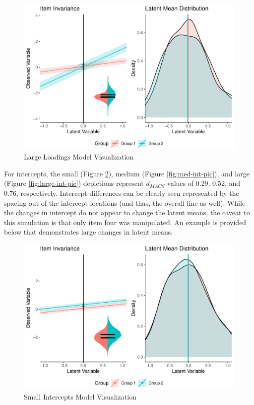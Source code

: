 \documentclass[
  man]{apa7}
\begin{document}
\begin{figure}
\centering
\includegraphics{manuscript_files/figure-latex/large-load-pic-1.pdf}
\caption{\label{fig:large-load-pic}Large Loadings Model Visualization}
\end{figure}

For intercepts, the small (Figure \ref{fig:small-int-pic}), medium (Figure \ref{fig:med-int-pic}), and large (Figure \ref{fig:large-int-pic}) depictions represent \(d_{MACS}\) values of 0.29, 0.52, and 0.76, respectively. Intercept differences can be clearly seen represented by the spacing out of the intercept locations (and thus, the overall line as well). While the changes in intercept do not appear to change the latent means, the caveat to this simulation is that only item four was manipulated. An example is provided below that demonstrates large changes in latent means.

\begin{figure}
\centering
\includegraphics{manuscript_files/figure-latex/small-int-pic-1.pdf}
\caption{\label{fig:small-int-pic}Small Intercepts Model Visualization}
\end{figure}
\end{document}
